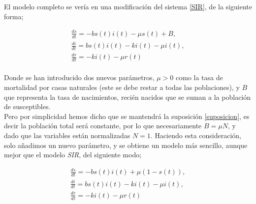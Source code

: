 \documentclass[journal]{IEEEtran}
\begin{document}
El modelo completo se vería en una modificación del sistema \ref{SIR}, de la siguiente forma;

\begin{equation*}
    \begin{split}
      \frac{ds}{dt} = -bs(t)i(t) - \mu s(t) + B,\\
      \frac{di}{dt} = bs(t)i(t)-ki(t)-\mu i(t),\\
      \frac{dr}{dt} = -ki(t) - \mu r(t)\\
    \end{split}
\end{equation*}

Donde se han introducido dos nuevos parámetros, $\mu > 0$ como la tasa de mortalidad por casas naturales 
(este se debe restar a todas las poblaciones), y $B$ que representa la tasa de nacimientos, recién nacidos que se suman
a la población de susceptibles.\\ 

Pero por simplicidad hemos dicho que se mantendrá la suposición \ref{suposicion}, es decir la población
total será constante, por lo que necesariamente $B = \mu N$, y dado que las variables están normalizadas
$N=1$. Haciendo esta consideración, solo añadimos un nuevo parámetro, 
y se obtiene un modelo más sencillo, aunque mejor que el modelo \textit{SIR}, del siguiente modo;

\begin{equation}\label{SIRS}
  \begin{split}
    \frac{ds}{dt} = -bs(t)i(t) + \mu (1 - s(t)) ,\\
    \frac{di}{dt} = bs(t)i(t)-ki(t)-\mu i(t),\\
    \frac{dr}{dt} = -ki(t) - \mu r(t)\\
  \end{split}
\end{equation}
\end{document}
